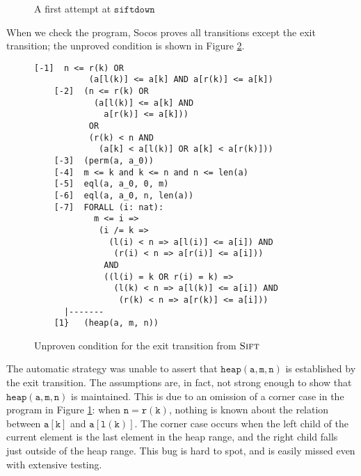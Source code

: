 \documentclass[english,submission]{eptcs}
\begin{document}
\begin{figure}
\begin{centering}
\par\end{centering}

\caption{A first attempt at $\texttt{siftdown}$ \label{fig:Siftdown-incomplete}}
\end{figure}

When we check the program, Socos proves all transitions
except the exit transition; the unproved condition is shown in Figure
\ref{fig:Unproved-condition-Sift}. 
\begin{figure}
\begin{lstlisting}[basicstyle={\small\ttfamily},frame=lines]
    [-1]  n <= r(k) OR
           (a[l(k)] <= a[k] AND a[r(k)] <= a[k])
    [-2]  (n <= r(k) OR
            (a[l(k)] <= a[k] AND
              a[r(k)] <= a[k]))
           OR
           (r(k) < n AND
             (a[k] < a[l(k)] OR a[k] < a[r(k)]))
    [-3]  (perm(a, a_0))
    [-4]  m <= k and k <= n and n <= len(a)
    [-5]  eql(a, a_0, 0, m)
    [-6]  eql(a, a_0, n, len(a))
    [-7]  FORALL (i: nat):
            m <= i =>
             (i /= k =>
               (l(i) < n => a[l(i)] <= a[i]) AND
                (r(i) < n => a[r(i)] <= a[i]))
              AND
              ((l(i) = k OR r(i) = k) =>
                (l(k) < n => a[l(k)] <= a[i]) AND
                 (r(k) < n => a[r(k)] <= a[i]))
      |-------
    [1}   (heap(a, m, n))
\end{lstlisting}


\caption[Unproven condition for the exit transition from $\textsc{Sift}$.]{Unproven condition for the exit transition from $\textsc{Sift}$
\label{fig:Unproved-condition-Sift}}
\end{figure} 
The automatic strategy was unable to assert that
$\mathtt{heap(a,m,n)}$ is established by the exit transition. The
assumptions are, in fact, not strong enough to show that
$\mathtt{heap(a,m,n)}$ is maintained.  This is due to an omission of a
corner case in the program in Figure \ref{fig:Siftdown-incomplete}:
when $\mathtt{n=r(k)}$, nothing is known about the relation between
$\mathtt{a[k]}$ and $\mathtt{a[l(k)]}$.  The corner case occurs when
the left child of the current element is the last element in the heap
range, and the right child falls just outside of the heap range.  This
bug is hard to spot, and is easily missed even with extensive testing.
\end{document}
